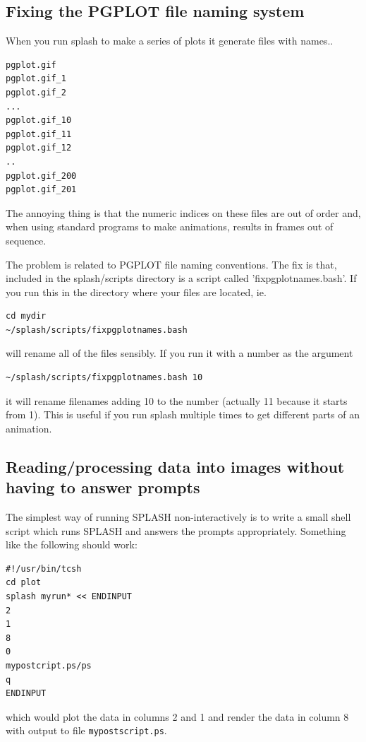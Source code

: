 \documentclass[a4paper,11pt]{article}
\begin{document}
\subsection{Fixing the PGPLOT file naming system} 
\label{sec:fixpgplotnames}

When you run splash to make a series of plots it generate files with names..
\begin{verbatim}
pgplot.gif
pgplot.gif_1
pgplot.gif_2
...
pgplot.gif_10
pgplot.gif_11
pgplot.gif_12
..
pgplot.gif_200
pgplot.gif_201
\end{verbatim}
The annoying thing is that the numeric indices on these files are out of order and, when using
standard programs to make animations, results in frames out of sequence.

 The problem is related to PGPLOT file naming conventions. The fix is that, included in the splash/scripts directory is a script called 'fixpgplotnames.bash'. If you run this in the directory where your files are located, ie.
\begin{verbatim}
cd mydir
~/splash/scripts/fixpgplotnames.bash
\end{verbatim}
will rename all of the files sensibly. If you run it with a number as the argument
\begin{verbatim}
~/splash/scripts/fixpgplotnames.bash 10
\end{verbatim}
it will rename filenames adding 10 to the number (actually 11 because it starts from 1). This is
useful if you run splash multiple times to get different parts of an animation. 

\subsection{Reading/processing data into images without having to answer prompts}
\label{sec:batchmode}
 The simplest way of running SPLASH
non-interactively is to write a small shell script which runs SPLASH
and answers the prompts appropriately. Something like the following should work:
\begin{verbatim}
#!/usr/bin/tcsh
cd plot
splash myrun* << ENDINPUT
2
1
8
0
mypostcript.ps/ps
q
ENDINPUT
\end{verbatim}
which would plot the data in columns 2 and 1 and render the data in column 8 with
output to file \verb+mypostscript.ps+.
\end{document}
